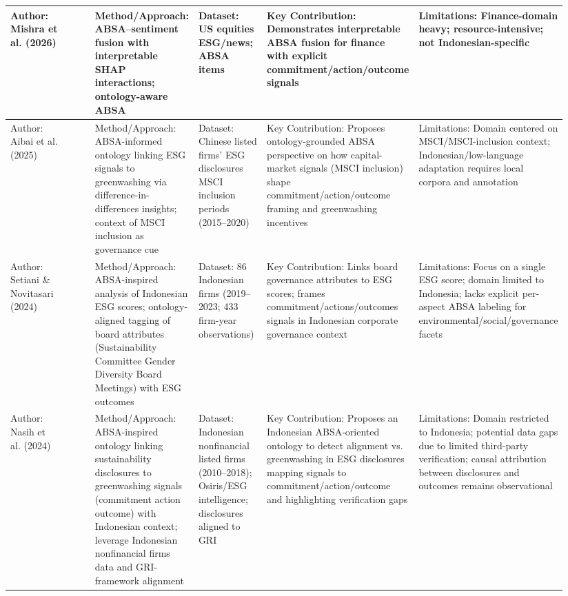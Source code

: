\documentclass{article}
\begin{document}
\begin{landscape}
\begin{longtable}{p{0.157\linewidth} p{0.157\linewidth} p{0.157\linewidth} p{0.157\linewidth} p{0.157\linewidth} p{0.157\linewidth}}
Author: Mishra et al. (2026) & ~ & Method/Approach: ABSA–sentiment fusion with interpretable SHAP interactions; ontology-aware ABSA & Dataset: US equities ESG/news; ABSA items & Key Contribution: Demonstrates interpretable ABSA fusion for finance with explicit commitment/action/outcome signals & Limitations: Finance-domain heavy; resource-intensive; not Indonesian-specific \\ \hline
Author: Aibai et al. (2025) & ~ & Method/Approach: ABSA-informed ontology linking ESG signals to greenwashing via difference-in-differences insights; context of MSCI inclusion as governance cue & Dataset: Chinese listed firms’ ESG disclosures MSCI inclusion periods (2015–2020) & Key Contribution: Proposes ontology-grounded ABSA perspective on how capital-market signals (MSCI inclusion) shape commitment/action/outcome framing and greenwashing incentives & Limitations: Domain centered on MSCI/MSCI-inclusion context; Indonesian/low-language adaptation requires local corpora and annotation \\ \hline
Author: Setiani \& Novitasari (2024) & ~ & Method/Approach: ABSA-inspired analysis of Indonesian ESG scores; ontology-aligned tagging of board attributes (Sustainability Committee Gender Diversity Board Meetings) with ESG outcomes & Dataset: 86 Indonesian firms (2019–2023; 433 firm-year observations) & Key Contribution: Links board governance attributes to ESG scores; frames commitment/actions/outcomes signals in Indonesian corporate governance context & Limitations: Focus on a single ESG score; domain limited to Indonesia; lacks explicit per-aspect ABSA labeling for environmental/social/governance facets \\ \hline
Author: Nasih et al. (2024) & ~ & Method/Approach: ABSA-inspired ontology linking sustainability disclosures to greenwashing signals (commitment action outcome) with Indonesian context; leverage Indonesian nonfinancial firms data and GRI-framework alignment & Dataset: Indonesian nonfinancial listed firms (2010–2018); Osiris/ESG intelligence; disclosures aligned to GRI & Key Contribution: Proposes an Indonesian ABSA-oriented ontology to detect alignment vs. greenwashing in ESG disclosures mapping signals to commitment/action/outcome and highlighting verification gaps & Limitations: Domain restricted to Indonesia; potential data gaps due to limited third-party verification; causal attribution between disclosures and outcomes remains observational \\ \hline

\end{longtable}
\end{landscape}
\end{document}
